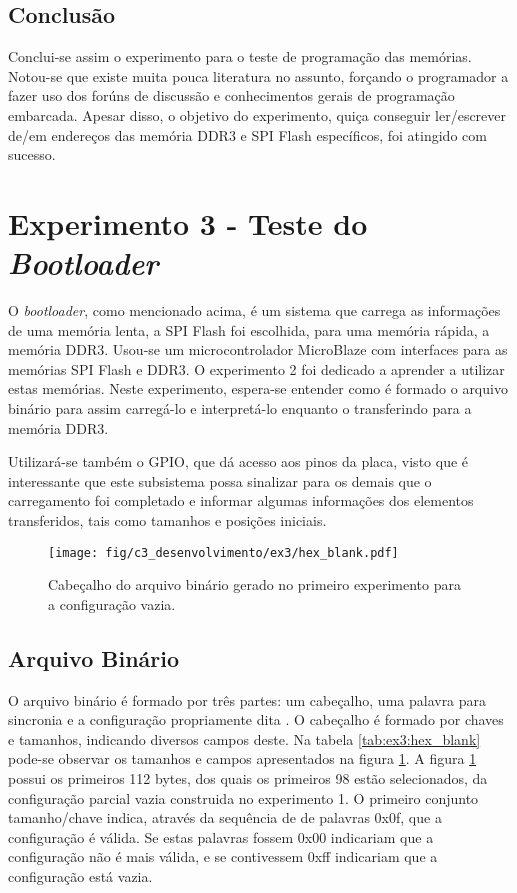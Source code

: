\documentclass[11pt,a4paper,oneside]{book}
\begin{document}
\subsection{Conclusão}
Conclui-se assim o experimento para o teste de programação das memórias.
Notou-se que existe muita pouca literatura no assunto, forçando o programador a fazer uso dos forúns de discussão e conhecimentos gerais de programação embarcada.
Apesar disso, o objetivo do experimento, quiça conseguir ler/escrever de/em endereços das memória DDR3 e SPI Flash específicos, foi atingido com sucesso.

\section{Experimento 3 - Teste do \textit{Bootloader}}
O \textit{bootloader}, como mencionado acima, é um sistema que carrega as informações de uma memória lenta, a SPI Flash foi escolhida, para uma memória rápida, a memória DDR3.
Usou-se um microcontrolador MicroBlaze com interfaces para as memórias SPI Flash e DDR3.
O experimento 2 foi dedicado a aprender a utilizar estas memórias.
Neste experimento, espera-se entender como é formado o arquivo binário para assim carregá-lo e interpretá-lo enquanto o transferindo para a memória DDR3.

Utilizará-se também o GPIO, que dá acesso aos pinos da placa, visto que é interessante que este subsistema possa sinalizar para os demais que o carregamento foi completado e informar algumas informações dos elementos transferidos, tais como tamanhos e posições iniciais.

\begin{figure}[htp]
\centering
\texttt{[image: fig/c3\_desenvolvimento/ex3/hex\_blank.pdf]}
\caption{Cabeçalho do arquivo binário gerado no primeiro experimento para a configuração vazia.}
\label{fig:ex3:hex_blank}
\end{figure}

\subsection{Arquivo Binário}
O arquivo binário é formado por três partes: um cabeçalho, uma palavra para sincronia e a configuração propriamente dita \cite{ug470, xapp583}.
O cabeçalho é formado por chaves e tamanhos, indicando diversos campos deste.
Na tabela \ref{tab:ex3:hex_blank} pode-se observar os tamanhos e campos apresentados na figura \ref{fig:ex3:hex_blank}.
A figura \ref{fig:ex3:hex_blank} possui os primeiros 112 bytes, dos quais os primeiros 98 estão selecionados, da configuração parcial vazia construida no experimento 1.
O primeiro conjunto tamanho/chave indica, através da sequência de de palavras 0x0f, que a configuração é válida.
Se estas palavras fossem 0x00 indicariam que a configuração não é mais válida, e se contivessem 0xff indicariam que a configuração está vazia.
\end{document}
